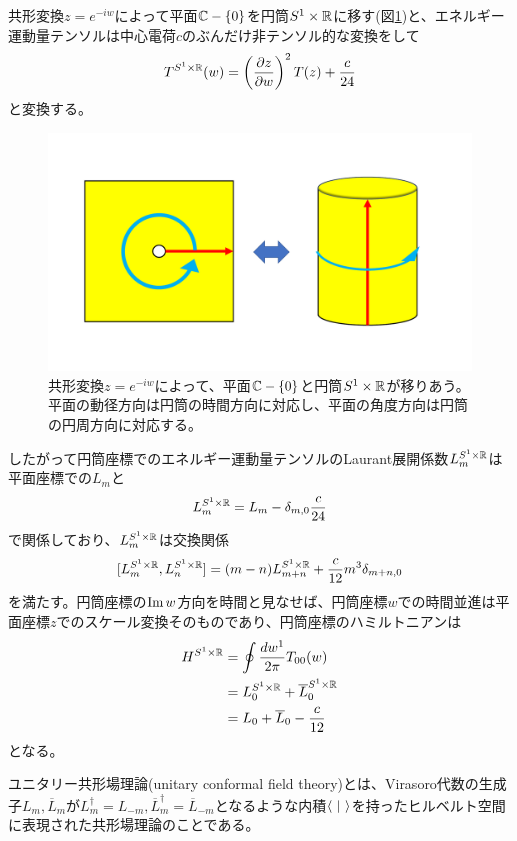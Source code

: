 共形変換$z=e^{-iw}$によって平面$\mathbb{C}-\{0\}$を円筒$S^1\times \mathbb{R}$に移す(図\ref{fig:plane2cylinder})と、エネルギー運動量テンソルは中心電荷$c$のぶんだけ非テンソル的な変換をして
\begin{align}
T^{S^1\times \mathbb{R}}(w)=\left(\frac{\partial z}{\partial w}\right)^2 T(z)+\frac{c}{24}
\end{align}
と変換する。
\begin{figure}[h]
	\centering
	\includegraphics[width=0.7\linewidth]{plane2cylinder.pdf}
	\caption{共形変換$z=e^{-iw}$によって、平面$\mathbb{C}-\{0\}$と円筒$S^1\times \mathbb{R}$が移りあう。平面の動径方向は円筒の時間方向に対応し、平面の角度方向は円筒の円周方向に対応する。}
	\label{fig:plane2cylinder}
\end{figure}

したがって円筒座標でのエネルギー運動量テンソルのLaurant展開係数$L_m^{S^1\times \mathbb{R}}$は平面座標での$L_m$と
\begin{align}
L_m^{S^1\times \mathbb{R}}=L_m-\delta_{m,0} \frac{c}{24}
\end{align}
で関係しており、$L_m^{S^1\times \mathbb{R}}$は交換関係
\begin{align}\label{vircrCylinder}
[L_m^{S^1\times \mathbb{R}},L_n^{S^1\times \mathbb{R}}]=(m-n)L_{m+n}^{S^1\times \mathbb{R}}+\frac{c}{12}m^3\delta_{m+n,0}
\end{align}
を満たす。円筒座標の$\text{Im}\, w$方向を時間と見なせば、円筒座標$w$での時間並進は平面座標$z$でのスケール変換そのものであり、円筒座標のハミルトニアンは
\begin{align}\label{hamincylinder}
H^{S^1\times \mathbb{R}}&=\oint \frac{dw^1}{2\pi} T_{00}(w)\notag\\
&=L_0^{S^1\times \mathbb{R}}+\overline{L}_0^{S^1\times \mathbb{R}}\\
&=L_0+\overline{L}_0-\frac{c}{12}
\end{align}
となる。

ユニタリー共形場理論(unitary conformal field theory)とは、Virasoro代数の生成子$L_m,\overline{L}_m$が$L_m^\dagger=L_{-m},\overline{L}_m^\dagger=\overline{L}_{-m}$となるような内積$\la\ |\ \ra$を持ったヒルベルト空間に表現された共形場理論のことである。

